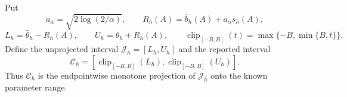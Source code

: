 Put
\[
 a_\alpha=\sqrt{2\log(2/\alpha)},\qquad
 R_h(A)=\overline b_h(A)+a_\alpha\overline s_h(A),
\]
\[
 L_h=\widehat\theta_h-R_h(A),\qquad
 U_h=\widehat\theta_h+R_h(A),\qquad
 \operatorname{clip}_{[-B,B]}(t)=\max\{-B,\min\{B,t\}\}.
\]
Define the unprojected interval \(\mathcal J_h=[L_h,U_h]\) and the reported interval
\[
 \mathcal C_h=
 [\operatorname{clip}_{[-B,B]}(L_h),
  \operatorname{clip}_{[-B,B]}(U_h)].
\]
Thus \(\mathcal C_h\) is the endpointwise monotone projection of \(\mathcal J_h\) onto the known parameter range.